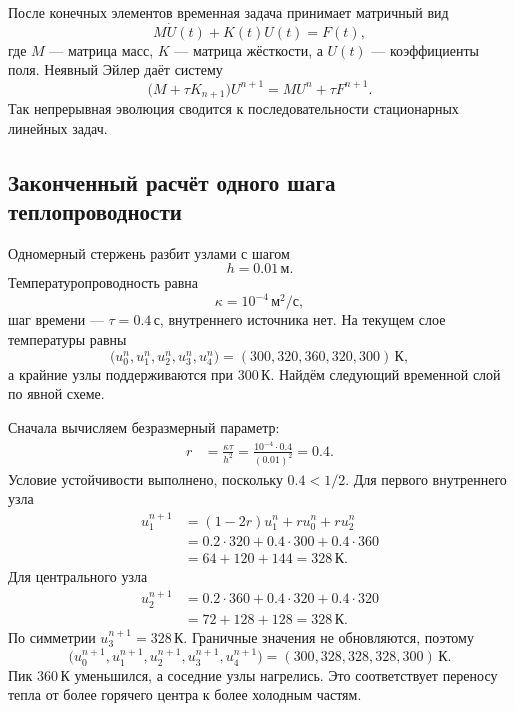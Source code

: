 После конечных элементов временная задача принимает матричный вид
\begin{equation}
\label{eq:semidiscrete-parabolic-system-v04}
 M\dot U(t)+K(t)U(t)=F(t),
\end{equation}
где $M$ --- матрица масс, $K$ --- матрица жёсткости, а $U(t)$ --- коэффициенты поля. Неявный Эйлер даёт систему
\begin{equation}
\label{eq:implicit-euler-matrix-v04}
 \bigl(M+\tau K_{n+1}\bigr)U^{n+1}
 =
 MU^n+\tau F^{n+1}.
\end{equation}
Так непрерывная эволюция сводится к последовательности стационарных линейных задач.

\subsection{Законченный расчёт одного шага теплопроводности}

\begin{problem}
Одномерный стержень разбит узлами с шагом
\[
 h=0.01\,\text{м}.
\]
Температуропроводность равна
\[
 \kappa=10^{-4}\,\text{м}^2/\text{с},
\]
шаг времени --- $\tau=0.4\,\text{с}$, внутреннего источника нет. На текущем слое температуры равны
\begin{equation}
\label{eq:heat-step-data-v04}
 \bigl(u_0^n,u_1^n,u_2^n,u_3^n,u_4^n\bigr)
 =
 (300,320,360,320,300)\,\text{К},
\end{equation}
а крайние узлы поддерживаются при $300\,\text{К}$. Найдём следующий временной слой по явной схеме.
\end{problem}

Сначала вычисляем безразмерный параметр:
\begin{align}
 r
 &=
 \frac{\kappa\tau}{h^2}
 =
 \frac{10^{-4}\cdot0.4}{(0.01)^2}
 =0.4.
\end{align}
Условие устойчивости выполнено, поскольку $0.4<1/2$. Для первого внутреннего узла
\begin{align}
 u_1^{n+1}
 &=(1-2r)u_1^n+r u_0^n+r u_2^n
 \\
 &=0.2\cdot320+0.4\cdot300+0.4\cdot360
 \\
 &=64+120+144
 =328\,\text{К}.
\end{align}
Для центрального узла
\begin{align}
 u_2^{n+1}
 &=0.2\cdot360+0.4\cdot320+0.4\cdot320
 \\
 &=72+128+128
 =328\,\text{К}.
\end{align}
По симметрии $u_3^{n+1}=328\,\text{К}$. Граничные значения не обновляются, поэтому
\begin{equation}
\label{eq:heat-step-result-v04}
 \bigl(u_0^{n+1},u_1^{n+1},u_2^{n+1},u_3^{n+1},u_4^{n+1}\bigr)
 =
 (300,328,328,328,300)\,\text{К}.
\end{equation}
Пик $360\,\text{К}$ уменьшился, а соседние узлы нагрелись. Это соответствует переносу тепла от более горячего центра к более холодным частям.

